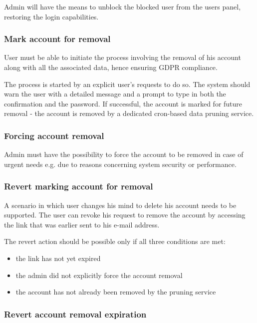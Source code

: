 \documentclass[a4paper,twoside,12pt]{book}
\begin{document}
Admin will have the means to unblock the blocked user from the users panel, restoring the login capabilities.

\subsubsection{Mark account for removal}

User must be able to initiate the process involving the removal of his account along with all the associated data, hence ensuring GDPR compliance.

The process is started by an explicit user's requests to do so. The system should warn the user with a detailed message and a prompt to type in both the confirmation and the password. If successful, the account is marked for future removal - the account is removed by a dedicated cron-based data pruning service.

\subsubsection{Forcing account removal}

Admin must have the possibility to force the account to be removed in case of urgent needs e.g. due to reasons concerning system security or performance.

\subsubsection{Revert marking account for removal}

A scenario in which user changes his mind to delete his account needs to be supported. The user can revoke his request to remove the account by accessing the link that was earlier sent to his e-mail address.

The revert action should be possible only if all three conditions are met:
\begin{itemize}
\item the link has not yet expired
\item the admin did not explicitly force the account removal
\item the account has not already been removed by the pruning service
\end{itemize}

\subsubsection{Revert account removal expiration}
\end{document}
